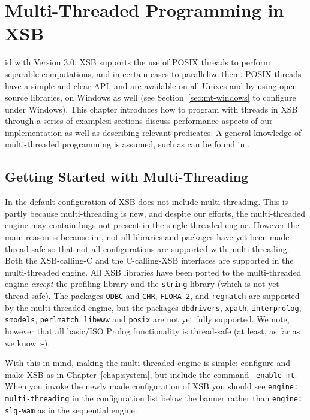 \chapter{Multi-Threaded Programming in XSB} \label{chap:threads}
id with Version 3.0, XSB supports the use of POSIX threads to
perform separable computations, and in certain cases to parallelize
them.  POSIX threads have a simple and clear API, and are available on
all Unixes and by using open-source libraries, on Windows as well (see
Section~\ref{sec:mt-windows} to configure under Windows).  This
chapter introduces how to program with threads in XSB through a series
of examplesi sections discuss performance aspects of our
implementation as well as describing relevant predicates.  A general
knowledge of multi-threaded programming is assumed, such as can be
found in \cite{LewB98,Bute97}.

\section{Getting Started with Multi-Threading}
%
In \version{} the default configuration of XSB does not include
multi-threading.  This is partly because multi-threading is new, and
despite our efforts, the multi-threaded engine may contain bugs not
present in the single-threaded engine.  However the main reason is
because in \version , not all libraries and packages have yet been
made thread-safe so that not all configurations are supported with
multi-threading.  Both the XSB-calling-C and the C-calling-XSB
interfaces are supported in the multi-threaded engine.  All XSB
libraries have been ported to the multi-threaded engine {\em except}
the profiling library and the {\tt string} library (which is not yet
thread-safe).  The packages {\tt ODBC} and {\tt CHR}, {\tt FLORA-2},
and {\tt regmatch} are supported by the multi-threaded engine, but the
packages {\tt dbdrivers}, {\tt xpath}, {\tt interprolog}, {\tt
  smodels}, {\tt perlmatch}, {\tt libwww} and {\tt posix} are not yet
fully supported.  We note, however that all basic/ISO Prolog
functionality is thread-safe (at least, as far as we know :-).

With this in mind, making the multi-threaded engine is simple:
configure and make XSB as in Chapter~\ref{chap:system}, but include
the command {\tt --enable-mt}.  When you invoke the newly made
configuration of XSB you should see {\tt engine: multi-threading} in
the configuration list below the banner rather than {\tt engine:
  slg-wam} as in the sequential engine.

